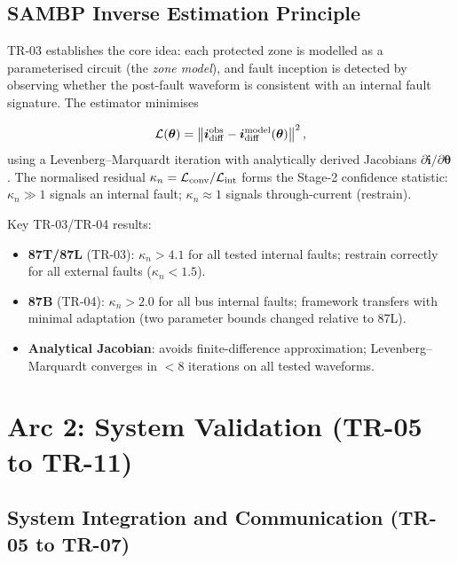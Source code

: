 \documentclass[11pt,a4paper]{article}
\begin{document}
\subsection{SAMBP Inverse Estimation Principle}

TR-03 establishes the core idea: each protected zone is modelled as a
parameterised circuit (the \emph{zone model}), and fault inception is
detected by observing whether the post-fault waveform is consistent with
an internal fault signature.  The estimator minimises

\begin{equation}
  \mathcal{L}(\bm{\theta}) =
    \left\| \bm{i}_{\rm diff}^{\rm obs} - \bm{i}_{\rm diff}^{\rm model}(\bm{\theta}) \right\|^2,
  \label{eq:loss}
\end{equation}
using a Levenberg--Marquardt iteration with analytically derived Jacobians
$\partial\bm{i}/\partial\bm{\theta}$.  The normalised residual
$\kappa_n = \mathcal{L}_{\rm conv} / \mathcal{L}_{\rm int}$
forms the Stage-2 confidence statistic:
$\kappa_n \gg 1$ signals an internal fault; $\kappa_n \approx 1$ signals
through-current (restrain).

Key TR-03/TR-04 results:
\begin{itemize}
  \item \textbf{87T/87L} (TR-03): $\kappa_n > 4.1$ for all tested internal
    faults; restrain correctly for all external faults ($\kappa_n < 1.5$).
  \item \textbf{87B} (TR-04): $\kappa_n > 2.0$ for all bus internal faults;
    framework transfers with minimal adaptation (two parameter bounds
    changed relative to 87L).
  \item \textbf{Analytical Jacobian}: avoids finite-difference approximation;
    Levenberg--Marquardt converges in $<$8 iterations on all tested waveforms.
\end{itemize}

\section{Arc 2: System Validation (TR-05 to TR-11)}

\subsection{System Integration and Communication (TR-05 to TR-07)}
\end{document}
